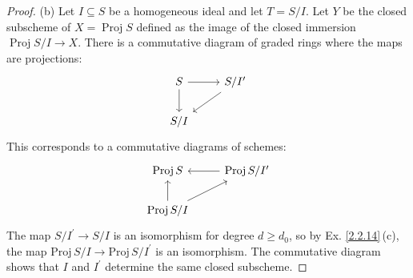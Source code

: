 \documentclass{amsart}
\begin{document}
\begin{proof}
	(b) Let $I \subseteq S$ be a homogeneous ideal and let $T=S / I $. Let $Y$ be the closed subscheme of $X=\operatorname{Proj} S$ defined as the image of the closed immersion $\operatorname{Proj} S / I \rightarrow X $. There is a commutative diagram of graded rings where the maps are projections:
	\begin{equation*}
		\begin{tikzcd}
		S \arrow[d] \arrow[r] & S / I^{\prime} \arrow[ld] \\
		S / I                 &                          
		\end{tikzcd}
	\end{equation*}
	This corresponds to a commutative diagrams of schemes:
	\begin{equation*}
		\begin{tikzcd}
		\operatorname{Proj} S                     & \operatorname{Proj} S / I^{\prime} \arrow[l] \\
		\operatorname{Proj} S / I \arrow[u] \arrow[ru] &                                             
		\end{tikzcd}
	\end{equation*}
	The map $S / I^{\prime} \rightarrow S / I$ is an isomorphism for degree $d \geq d_{0}$, so by Ex. \ref{2.2.14}\,(c), the map $\mathrm{Proj}\,S / I \rightarrow \mathrm{Proj}\, S / I^{\prime}$ is an isomorphism. The commutative diagram shows that $I$ and $I^{\prime}$ determine the same closed subscheme.
\end{proof}
\end{document}
